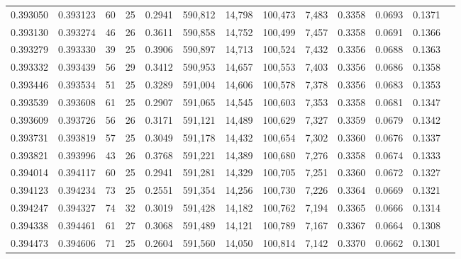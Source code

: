 \begin{tabular}{rrrrrrrrrrrrr}
0.393050 & 0.393123 &    60 &  25 &                                     0.2941 & 590,812 &  14,798 & 100,473 &   7,483 & 0.3358 & 0.0693 & 0.1371 \\
0.393130 & 0.393274 &    46 &  26 &                                     0.3611 & 590,858 &  14,752 & 100,499 &   7,457 & 0.3358 & 0.0691 & 0.1366 \\
0.393279 & 0.393330 &    39 &  25 &                                     0.3906 & 590,897 &  14,713 & 100,524 &   7,432 & 0.3356 & 0.0688 & 0.1363 \\
0.393332 & 0.393439 &    56 &  29 &                                     0.3412 & 590,953 &  14,657 & 100,553 &   7,403 & 0.3356 & 0.0686 & 0.1358 \\
0.393446 & 0.393534 &    51 &  25 &                                     0.3289 & 591,004 &  14,606 & 100,578 &   7,378 & 0.3356 & 0.0683 & 0.1353 \\
0.393539 & 0.393608 &    61 &  25 &                                     0.2907 & 591,065 &  14,545 & 100,603 &   7,353 & 0.3358 & 0.0681 & 0.1347 \\
0.393609 & 0.393726 &    56 &  26 &                                     0.3171 & 591,121 &  14,489 & 100,629 &   7,327 & 0.3359 & 0.0679 & 0.1342 \\
0.393731 & 0.393819 &    57 &  25 &                                     0.3049 & 591,178 &  14,432 & 100,654 &   7,302 & 0.3360 & 0.0676 & 0.1337 \\
0.393821 & 0.393996 &    43 &  26 &                                     0.3768 & 591,221 &  14,389 & 100,680 &   7,276 & 0.3358 & 0.0674 & 0.1333 \\
0.394014 & 0.394117 &    60 &  25 &                                     0.2941 & 591,281 &  14,329 & 100,705 &   7,251 & 0.3360 & 0.0672 & 0.1327 \\
0.394123 & 0.394234 &    73 &  25 &                                     0.2551 & 591,354 &  14,256 & 100,730 &   7,226 & 0.3364 & 0.0669 & 0.1321 \\
0.394247 & 0.394327 &    74 &  32 &                                     0.3019 & 591,428 &  14,182 & 100,762 &   7,194 & 0.3365 & 0.0666 & 0.1314 \\
0.394338 & 0.394461 &    61 &  27 &                                     0.3068 & 591,489 &  14,121 & 100,789 &   7,167 & 0.3367 & 0.0664 & 0.1308 \\
0.394473 & 0.394606 &    71 &  25 &                                     0.2604 & 591,560 &  14,050 & 100,814 &   7,142 & 0.3370 & 0.0662 & 0.1301 \\

\end{tabular}
